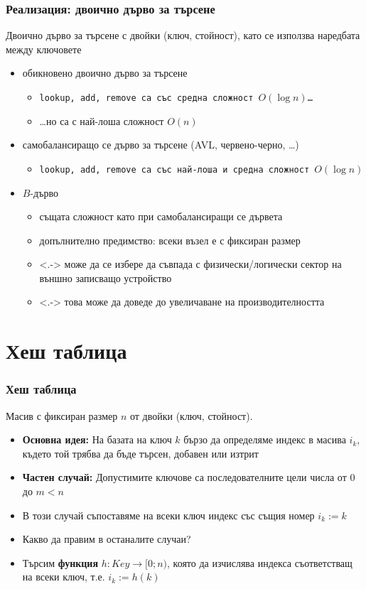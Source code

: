 \documentclass[alsotrans,beameroptions={aspectratio=169}]{beamerswitch}
\begin{document}
\begin{frame}
  \frametitle{Реализация: двоично дърво за търсене}
  Двоично дърво за търсене с двойки (ключ, стойност), като се използва наредбата между ключовете
  \pause
  \begin{itemize}[<+->]
  \item обикновено двоично дърво за търсене
    \begin{itemize}
    \item \tt{lookup}, \tt{add}, \tt{remove} са със средна сложност $O(\log n)$\ldots
    \item \ldots но са с най-лоша сложност $O(n)$
    \end{itemize}
  \item самобалансиращо се дърво за търсене (AVL, червено-черно, \ldots)
    \begin{itemize}
    \item \tt{lookup}, \tt{add}, \tt{remove} са със най-лоша и средна сложност \alert{$O(\log n)$}
    \end{itemize}
  \item $B$-дърво
    \begin{itemize}
    \item същата сложност като при самобалансиращи се дървета
    \item допълнително предимство: всеки възел е с фиксиран размер
    \item<.-> може да се избере да съвпада с физически/логически сектор на външно записващо устройство
    \item<.-> това може да доведе до увеличаване на производителността
    \end{itemize}
  \end{itemize}
\end{frame}

\section{Хеш таблица}

\begin{frame}
  \frametitle{Хеш таблица}
  Масив с фиксиран размер $n$ от двойки (ключ, стойност).
  \begin{itemize}[<+->]
  \item \textbf{Основна идея:} На базата на ключ $k$ бързо да определяме индекс в масива $i_k$, където той трябва да бъде търсен, добавен или изтрит
  \item \textbf{Частен случай:} Допустимите ключове са последователните цели числа от 0 до $m < n$
  \item В този случай съпоставяме на всеки ключ индекс със същия номер $i_k := k$
  \item Какво да правим в останалите случаи?
  \item Търсим \textbf{функция} $h : Key \rightarrow [0; n)$, която да изчислява индекса съответстващ на всеки ключ, т.е. $i_k := h(k)$
  \end{itemize}
\end{frame}
\end{document}
